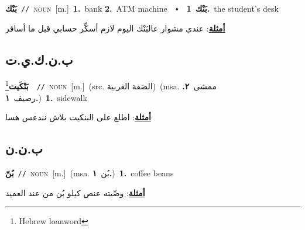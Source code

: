 \documentclass[10pt,a4paper,twoside]{article} %
\begin{document}
\begin{multicols}{2}
{\setlength\topsep{0pt}\textbf{\foreignlanguage{arabic}{بَنْك}}\ {\color{gray}\texttt{//}\color{black}}\ \textsc{noun}\ [m.]\ \textbf{1.}~bank  \textbf{2.}~ATM machine\ \ $\smblkdiamond$\ \ \setlength\topsep{0pt}\textbf{\foreignlanguage{arabic}{بَنْك}}\ \textbf{1.}~the student's desk\  \begin{flushright}\color{gray}\foreignlanguage{arabic}{\textbf{\underline{\foreignlanguage{arabic}{أمثلة}}}: عندي مشوار عالبَنْك اليوم لازم أسكِّر حسابي قبل ما أسافر}\end{flushright}\color{black}} \vspace{2mm}

\vspace{-3mm}
\subsection*{\color{blue}\foreignlanguage{arabic}{ب.ن.ك.ي.ت}\color{blue}{ (ntws)}} 

{\setlength\topsep{0pt}\textbf{\foreignlanguage{arabic}{بَنْكَيت}}\footnote{Hebrew loanword}\ \ {\color{gray}\texttt{//}\color{black}}\ \textsc{noun}\ [m.]\ (src. \color{gray}\foreignlanguage{arabic}{الضفة الغربية}\color{black})\ \color{gray}(msa. \foreignlanguage{arabic}{ممشى}~\foreignlanguage{arabic}{\textbf{٢.}}  \foreignlanguage{arabic}{رصيف}~\foreignlanguage{arabic}{\textbf{١.}})\color{black}\ \textbf{1.}~sidewalk\  \begin{flushright}\color{gray}\foreignlanguage{arabic}{\textbf{\underline{\foreignlanguage{arabic}{أمثلة}}}: اطلع على البنكيت بلاش نندعس هسا}\end{flushright}\color{black}} \vspace{2mm}

\vspace{-3mm}
\subsection*{\color{blue}\foreignlanguage{arabic}{ب.ن.ن}\color{blue}{}} 

{\setlength\topsep{0pt}\textbf{\foreignlanguage{arabic}{بُنّ}}\ {\color{gray}\texttt{//}\color{black}}\ \textsc{noun}\ [m.]\ \color{gray}(msa. \foreignlanguage{arabic}{بُن}~\foreignlanguage{arabic}{\textbf{١.}})\color{black}\ \textbf{1.}~coffee beans\  \begin{flushright}\color{gray}\foreignlanguage{arabic}{\textbf{\underline{\foreignlanguage{arabic}{أمثلة}}}: وصِّيته عنص كيلو بُن من عند العميد}\end{flushright}\color{black}} \vspace{2mm}


\end{multicols}
\end{document}
